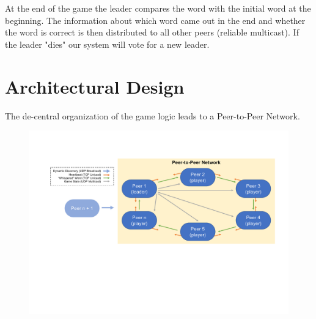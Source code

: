 \documentclass[runningheads]{llncs}
\begin{document}
        At the end of the game the leader compares the word with the initial word at the beginning. The information about which word came out in the end and whether the word is correct is then distributed to all other peers (reliable multicast). If the leader "dies" our system will vote for a new leader.
    
\section{Architectural Design}
    The de-central organization of the game logic leads to a Peer-to-Peer Network.

    \begin{figure}
        \includegraphics[width=\textwidth]{architecture.pdf}
    \end{figure}
\end{document}
